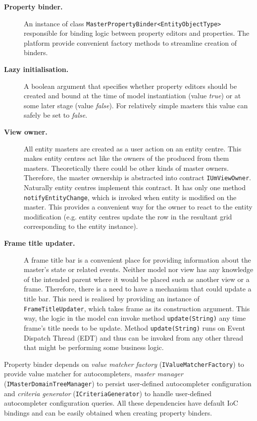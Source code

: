 \begin{description}
   \item[\textbf{Property binder.}] An instance of class \texttt{MasterPropertyBinder<EntityObjectType>} responsible for binding logic between property editors and properties.
   The platform provide convenient factory methods to streamline creation of binders.
   \item[\textbf{Lazy initialisation.}] A boolean argument that specifies whether property editors should be created and bound at the time of model instantiation (value \emph{true}) or at some later stage (value \emph{false}).
   For relatively simple masters this value can safely be set to \emph{false}.
   \item[\textbf{View owner.}] All entity masters are created as a user action on an entity centre.
   This makes entity centres act like the owners of the produced from them masters.
   Theoretically there could be other kinds of master owners.
   Therefore, the master ownership is abstracted into contract \texttt{IUmViewOwner}.
   Naturally entity centres implement this contract.
   It has only one method \texttt{notifyEntityChange}, which is invoked when entity is modified on the master.
   This provides a convenient way for the owner to react to the entity modification (e.g. entity centres update the row in the resultant grid corresponding to the entity instance).
   \item[\textbf{Frame title updater.}] A frame title bar is a convenient place for providing information about the master's state or related events.
   Neither model nor view has any knowledge of the intended parent where it would be placed such as another view or a frame.
   Therefore, there is a need to have a mechanism that could update a title bar.
   This need is realised by providing an instance of \texttt{FrameTitleUpdater}, which takes frame as its construction argument.
   This way, the logic in the model can invoke method \texttt{update(String)} any time frame's title needs to be update.
   Method \texttt{update(String)} runs on Event Dispatch Thread (EDT) and thus can be invoked from any other thread that might be performing some business logic.   
  \end{description}
  
  Property binder depends on \emph{value matcher factory} (\texttt{IValueMatcherFactory}) to provide value matcher for autocompleters, \emph{master manager} (\texttt{IMasterDomainTreeManager}) to persist user-defined autocompleter configuration and \emph{criteria generator} (\texttt{ICriteriaGenerator}) to handle  user-defined autocompleter configuration queries.
  All these dependencies have default IoC bindings and can be easily obtained when creating property binders.
  
